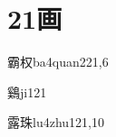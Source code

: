 
\section*{21画}

\begin{verbete}{霸权}{ba4quan2}{21,6}
\end{verbete}

\begin{verbete}{鷄}{ji1}{21}
\end{verbete}

\begin{verbete}{露珠}{lu4zhu1}{21,10}
\end{verbete}


